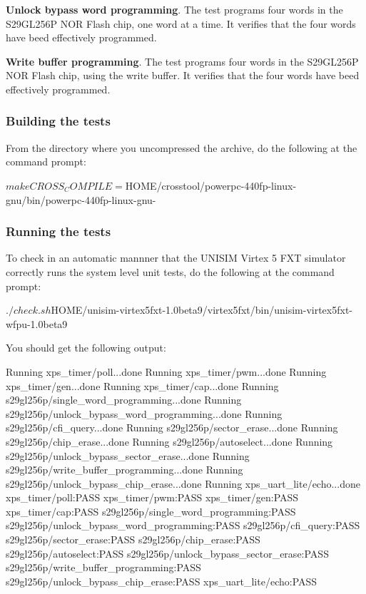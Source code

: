 \noindent \textbf{Unlock bypass word programming}. The test programs four words in the S29GL256P NOR Flash chip, one word at a time.
It verifies that the four words have beed effectively programmed.

\noindent \textbf{Write buffer programming}. The test programs four words in the S29GL256P NOR Flash chip, using the write buffer.
It verifies that the four words have beed effectively programmed.

\subsubsection{Building the tests}

From the directory where you uncompressed the archive, do the following at the command prompt:
\begin{script}
   $ make CROSS_COMPILE=${HOME}/crosstool/powerpc-440fp-linux-gnu/bin/powerpc-440fp-linux-gnu-
\end{script}

\subsubsection{Running the tests}

\noindent To check in an automatic mannner that the UNISIM Virtex 5 FXT simulator correctly runs the system level unit tests, do the following at the command prompt:
\begin{script}
   $ ./check.sh ${HOME}/unisim-virtex5fxt-1.0beta9/virtex5fxt/bin/unisim-virtex5fxt-wfpu-1.0beta9
\end{script}

\noindent You should get the following output:
\begin{script}
Running xps_timer/poll...done
Running xps_timer/pwm...done
Running xps_timer/gen...done
Running xps_timer/cap...done
Running s29gl256p/single_word_programming...done
Running s29gl256p/unlock_bypass_word_programming...done
Running s29gl256p/cfi_query...done
Running s29gl256p/sector_erase...done
Running s29gl256p/chip_erase...done
Running s29gl256p/autoselect...done
Running s29gl256p/unlock_bypass_sector_erase...done
Running s29gl256p/write_buffer_programming...done
Running s29gl256p/unlock_bypass_chip_erase...done
Running xps_uart_lite/echo...done
xps_timer/poll:PASS
xps_timer/pwm:PASS
xps_timer/gen:PASS
xps_timer/cap:PASS
s29gl256p/single_word_programming:PASS
s29gl256p/unlock_bypass_word_programming:PASS
s29gl256p/cfi_query:PASS
s29gl256p/sector_erase:PASS
s29gl256p/chip_erase:PASS
s29gl256p/autoselect:PASS
s29gl256p/unlock_bypass_sector_erase:PASS
s29gl256p/write_buffer_programming:PASS
s29gl256p/unlock_bypass_chip_erase:PASS
xps_uart_lite/echo:PASS
\end{script}

